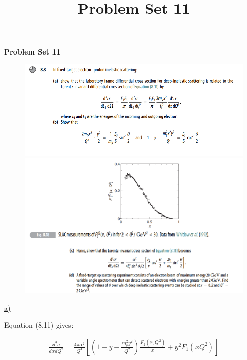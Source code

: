 \documentclass[11pt]{article}
\theoremstyle{definition}
\begin{document}
\setcounter{section}{2}
\title{Problem Set 11}

\pagestyle{fancy}
\fancyhf{}

\begin{center}
{\LARGE \bf Problem Set 11}\\
\end{center}

\begin{figure}[H]
    \centering
    \includegraphics[scale = 0.5]{8.3a.png}
    \includegraphics[scale = 0.5]{8.3b.png}
\end{figure}

\underline{a)}

Equation (8.11) gives:

\begin{align}
    \frac{d^2\sigma}{dxdQ^2}
    =
    \frac{4\pi\alpha^2}{Q^4}
    \left[
        \left(
            1 - y - \frac{m_p^2y^2}{Q^2}
        \right)
        \frac{F_2(x,Q^2)}{x}
        +
        y^2F_1(xQ^2)
    \right]
\end{align}
\end{document}
